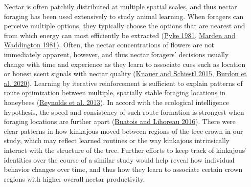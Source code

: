 \documentclass[twoside,12pt,final]{ucthesis-CA2012}
\begin{document}
\begin{ucmainmatter}
Nectar is often patchily distributed at multiple spatial scales, and thus nectar foraging has been used extensively to study animal learning. When foragers can perceive multiple options, they typically choose the options that are nearest and from which energy can most efficiently be extracted (\protect\hyperlink{ref-pyke1981}{Pyke 1981}, \protect\hyperlink{ref-marden1981}{Marden and Waddington 1981}). Often, the nectar concentrations of flowers are not immediately apparent, however, and thus nectar foragers' decisions usually change with time and experience as they learn to associate cues such as location or honest scent signals with nectar quality (\protect\hyperlink{ref-knauer2015}{Knauer and Schiestl 2015}, \protect\hyperlink{ref-burdon2020}{Burdon et al. 2020}). Learning by iterative reinforcement is sufficient to explain patterns of route optimization between multiple, spatially stable foraging locations in honeybees (\protect\hyperlink{ref-reynolds2013}{Reynolds et al. 2013}). In accord with the ecological intelligence hypothesis, the speed and consistency of such route formation is strongest when foraging locations are further apart (\protect\hyperlink{ref-buatois2016}{Buatois and Lihoreau 2016}). There were clear patterns in how kinkajous moved between regions of the tree crown in our study, which may reflect learned routines or the way kinkajous intrinsically interact with the structure of the tree. Further efforts to keep track of kinkajous' identities over the course of a similar study would help reveal how individual behavior changes over time, and thus how they learn to associate certain crown regions with higher overall nectar productivity.


\end{ucmainmatter}
\end{document}

